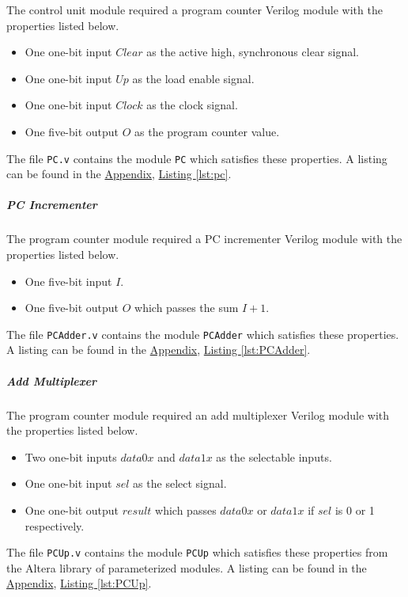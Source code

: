 The control unit module required a program counter Verilog module with the properties listed below.

\begin{itemize}
    \item One one-bit input $Clear$ as the active high, synchronous clear signal.
    \item One one-bit input $Up$ as the load enable signal.
    \item One one-bit input $Clock$ as the clock signal.
    \item One five-bit output $O$ as the program counter value.
\end{itemize}

The file \verb|PC.v| contains the module \verb|PC| which satisfies these properties.
A listing can be found in the \hyperref[sec:appendix]{Appendix}, \hyperref[lst:pc]{Listing \ref*{lst:pc}}.

\subparagraph{PC Incrementer} \label{subpar:pcadder}

The program counter module required a PC incrementer Verilog module with the properties listed below.

\begin{itemize}
    \item One five-bit input $I$.
    \item One five-bit output $O$ which passes the sum $I + 1$.
\end{itemize}

The file \verb|PCAdder.v| contains the module \verb|PCAdder| which satisfies these properties.
A listing can be found in the \hyperref[sec:appendix]{Appendix}, \hyperref[lst:PCAdder]{Listing \ref*{lst:PCAdder}}.

\subparagraph{Add Multiplexer} \label{subpar:pcup}

The program counter module required an add multiplexer Verilog module with the properties listed below.

\begin{itemize}
    \item Two one-bit inputs $data0x$ and $data1x$ as the selectable inputs.
    \item One one-bit input $sel$ as the select signal.
    \item One one-bit output $result$ which passes $data0x$ or $data1x$ if $sel$ is 0 or 1 respectively.
\end{itemize}


The file \verb|PCUp.v| contains the module \verb|PCUp| which satisfies these properties from the Altera library of parameterized modules.
A listing can be found in the \hyperref[sec:appendix]{Appendix}, \hyperref[lst:PCUp]{Listing \ref*{lst:PCUp}}.

